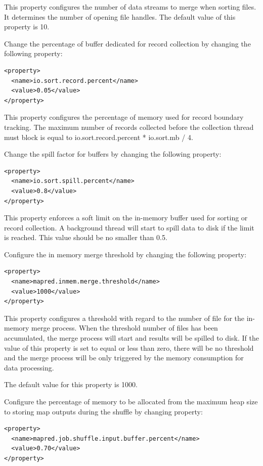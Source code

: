 This property configures the number of data streams to merge when sorting files. It determines the number of opening file handles. The default value of this property is 10.


Change the percentage of buffer dedicated for record collection by changing the following property:
\lstset{style=bashstyle}
\begin{lstlisting}
<property>
  <name>io.sort.record.percent</name>
  <value>0.05</value>
</property>
\end{lstlisting}
This property configures the percentage of memory used for record boundary tracking.  The maximum number of records collected before the collection thread must block is equal to io.sort.record.percent * io.sort.mb / 4.

Change the spill factor for buffers by changing the following property:
\lstset{style=bashstyle}
\begin{lstlisting}
<property>
  <name>io.sort.spill.percent</name>
  <value>0.8</value>
</property>
\end{lstlisting}
This property enforces a soft limit on the in-memory buffer used for sorting or record collection. A background thread will start to spill data to disk if the limit is reached. This value should be no smaller than 0.5.


Configure the in memory merge threshold by changing the following property:
\lstset{style=bashstyle}
\begin{lstlisting}
<property>
  <name>mapred.inmem.merge.threshold</name>
  <value>1000</value>
</property>
\end{lstlisting}
This property configures a threshold with regard to the number of file for the in-memory merge process. When the threshold number of files has been accumulated, the merge process will start and results will be spilled to disk. If the value of this property is set to equal or less than zero, there will be no threshold and the merge process will be only triggered by the memory consumption for data processing.

\begin{info}The default value for this property is 1000.\end{info}

Configure the percentage of memory to be allocated from the maximum heap size to storing map outputs during the shuffle by changing property:
\lstset{style=bashstyle}
\begin{lstlisting}
<property>
  <name>mapred.job.shuffle.input.buffer.percent</name>
  <value>0.70</value>
</property>
\end{lstlisting}

